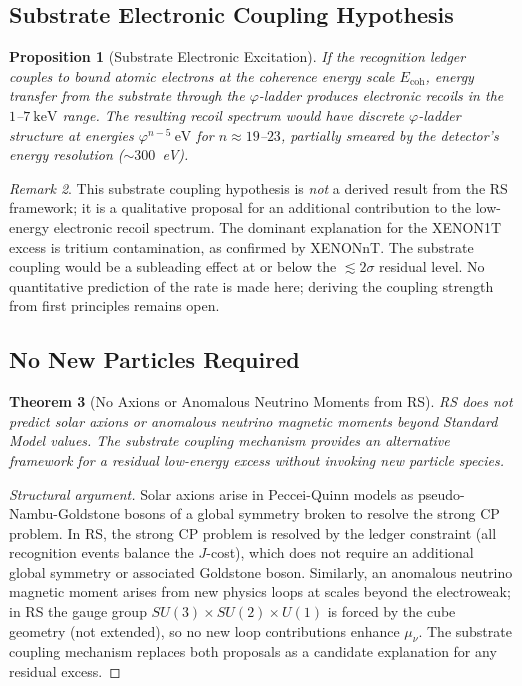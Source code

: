 \documentclass[12pt,a4paper]{article}
\newtheorem{theorem}{Theorem}[section]
\newtheorem{proposition}[theorem]{Proposition}
\theoremstyle{definition}
\theoremstyle{remark}
\newtheorem{remark}[theorem]{Remark}
\begin{document}
\subsection{Substrate Electronic Coupling Hypothesis}

\begin{proposition}[Substrate Electronic Excitation]
\label{prop:coupling}
If the recognition ledger couples to bound atomic electrons at the
coherence energy scale $E_{\mathrm{coh}}$, energy transfer from the
substrate through the $\varphi$-ladder produces electronic recoils in
the $1$--$7~\mathrm{keV}$ range.  The resulting recoil spectrum would
have discrete $\varphi$-ladder structure at energies $\varphi^{n-5}~\mathrm{eV}$
for $n \approx 19$--$23$, partially smeared by the detector's energy
resolution ($\sim 300$~eV).
\end{proposition}

\begin{remark}
This substrate coupling hypothesis is \emph{not} a derived result
from the RS framework; it is a qualitative proposal for an additional
contribution to the low-energy electronic recoil spectrum.  The
dominant explanation for the XENON1T excess is tritium contamination,
as confirmed by XENONnT.  The substrate coupling would be a
subleading effect at or below the $\lesssim 2\sigma$ residual level.
No quantitative prediction of the rate is made here; deriving the
coupling strength from first principles remains open.
\end{remark}

\subsection{No New Particles Required}

\begin{theorem}[No Axions or Anomalous Neutrino Moments from RS]
\label{thm:no-axion}
RS does not predict solar axions or anomalous neutrino magnetic moments
beyond Standard Model values.  The substrate coupling mechanism
provides an alternative framework for a residual low-energy excess
without invoking new particle species.
\end{theorem}

\begin{proof}[Structural argument]
Solar axions arise in Peccei-Quinn models as pseudo-Nambu-Goldstone bosons of a global symmetry broken to resolve the strong CP problem.  In RS, the strong CP problem is resolved by the ledger constraint (all recognition events balance the $J$-cost), which does not require an additional global symmetry or associated Goldstone boson.  Similarly, an anomalous neutrino magnetic moment arises from new physics loops at scales beyond the electroweak; in RS the gauge group $SU(3)\times SU(2)\times U(1)$ is forced by the cube geometry (not extended), so no new loop contributions enhance $\mu_\nu$.  The substrate coupling mechanism replaces both proposals as a candidate explanation for any residual excess.
\end{proof}
\end{document}
